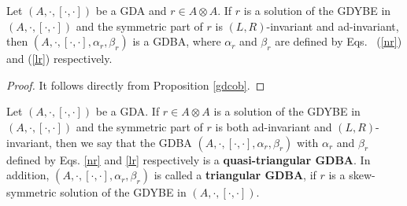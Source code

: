 \documentclass[12pt]{amsart}
\begin{document}





\begin{corollary}\label{rmk-m2}
Let $(A,\cdot,[\cdot,\cdot])$ be a GDA and $r\in A\otimes A$. If
$r$ is a solution of the GDYBE  in $(A,\cdot,[\cdot,\cdot])$ and
the symmetric part of $r$  is   $(L,R)$-invariant and {\rm
ad}-invariant, then $(A,\cdot,[\cdot,\cdot],\alpha_r,\beta_r)$ is
a  GDBA, where $\alpha_r$ and $\beta_r$ are defined by Eqs.~{\rm
(\ref{nr})} and {\rm (\ref{lr})} respectively.
\end{corollary}


\begin{proof}
It follows directly from Proposition \ref{gdcob}.
\end{proof}

\begin{definition}
Let $(A,\cdot,[\cdot,\cdot])$ be a GDA. If $r\in A\otimes A$ is a
solution of the GDYBE in $(A,\cdot,[\cdot,\cdot])$ and the
symmetric part of  $r$ is both {\rm ad}-invariant and
$(L,R)$-invariant, then we say that the GDBA
$(A,\cdot,[\cdot,\cdot],\alpha_r,\beta_r)$ with $\alpha_r$ and
$\beta_r$ defined by Eqs. \eqref{nr} and \eqref{lr} respectively
is a {\bf quasi-triangular GDBA}.   In addition,
$(A,\cdot,[\cdot,\cdot],\alpha_r,\beta_r)$ is called a {\bf
triangular GDBA}, if $r$ is a skew-symmetric solution of the GDYBE
in $(A,\cdot,[\cdot,\cdot])$.

\end{definition}


 




\end{document}

